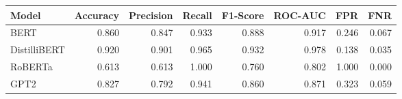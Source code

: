 \begin{tabular}{|l||r|r|r|r|r|r|r|}
\toprule
Model & \textbf{Accuracy} & \textbf{Precision} & Recall & \textbf{F1-Score} & \textbf{ROC-AUC} & \textbf{FPR} & FNR \\
\midrule \midrule
BERT & 0.860 & 0.847 & 0.933 & 0.888 & 0.917 & 0.246 & 0.067 \\
DistilliBERT & 0.920 & 0.901 & 0.965 & 0.932 & 0.978 & 0.138 & 0.035 \\
RoBERTa & 0.613 & 0.613 & 1.000 & 0.760 & 0.802 & 1.000 & 0.000 \\
GPT2 & 0.827 & 0.792 & 0.941 & 0.860 & 0.871 & 0.323 & 0.059 \\
\bottomrule
\end{tabular}

